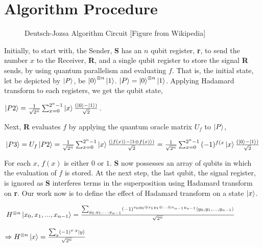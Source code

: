 \documentclass{article}
\begin{document}
\section{Algorithm Procedure}
\begin{figure}[H]
\centering 
\noindent{}%
\caption{Deutsch-Jozsa Algorithm Circuit [Figure from Wikipedia]}
\end{figure}
Initially, to start with, the Sender, \textbf{S} has an $n$ qubit register, \textbf{r}, to send the number $x$ to the Receiver, \textbf{R},  and a single qubit register to store the signal  \textbf{R} sends, by using quantum parallelism and evaluating $f$.  That is, the initial state, let be depicted by $\ket{P}$, be $\ket{0}^{ \otimes n} \ket{1}$. $\ket{P}=\ket{0}^{ \otimes n} \ket{1}$. Applying Hadamard transform to each registers, we get the qubit state, 
\begin{center}
$\ket{P2}={1 \over \sqrt{2^n}}\sum_{x=0}^{2^n-1}{\ket{x}{(\ket{0}-\ket{1}) \over \sqrt{2}}}$.
\end{center}
Next, \textbf{R} evaluates $f$ by applying the quantum oracle matrix $U_f$ to $\ket{P}$,
\begin{center}
$\ket{P3}=U_f\ket{P2}={1 \over \sqrt{2^n}}\sum_{x=0}^{2^n-1}{\ket{x}{(\ket{f(x)} - \ket{1 \oplus f(x)}) \over \sqrt{2}}}={1 \over \sqrt{2^n}}\sum_{x=0}^{2^n-1}{(-1)^{f(x}\ket{x}{(\ket{0} - \ket{1}) \over \sqrt{2}}}$
\end{center}
For each $x$, $f(x)$ is either $0$ or $1$.  \textbf{S} now possesses an array of qubits in which the evaluation of $f$ is stored. At the next step, the last qubit, the signal register, is ignored as \textbf{S} interferes terms in the superposition using Hadamard transform on \textbf{r}. Our work now is to define the effect of Hadamard transform on a state $\ket{x}$.
\begin{center}
${H^{\otimes n}\ket{x_0, x_1,...,x_{n-1}}} = {\sum_{y_0, y_1,...,y_{n-1}}(-1)^{x_0 y_0 \oplus x_1 y_1 \oplus...\oplus x_{n-1}y_{n-1}}\ket{y_0,y_1,...,y_{n-1}}\over \sqrt{2^n}}$\\ \par
$\Rightarrow H^{\otimes n}\ket{x}={\sum_{y} (-1)^{x.y}\ket{y} \over \sqrt{2^n}}$
\end{center}
\end{document}
